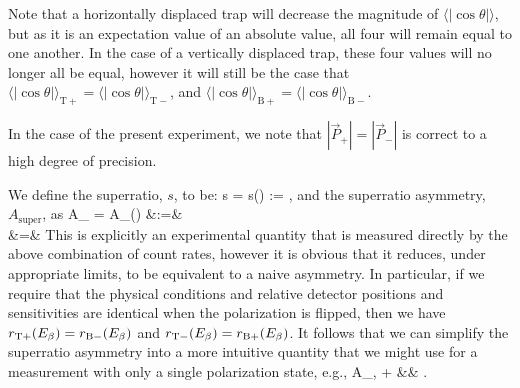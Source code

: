  Note that a horizontally displaced trap will decrease the magnitude of $\langle | \cos\theta | \rangle $, but as it is an expectation value of an absolute value, all four will remain equal to one another.  In the case of a vertically displaced trap, these four values will no longer all be equal, however it will still be the case that $\langle | \cos\theta | \rangle_{\mathrm T +} = \langle | \cos\theta | \rangle_{\mathrm T -}$, and $\langle | \cos\theta | \rangle_{\mathrm B+} = \langle | \cos\theta | \rangle_{\mathrm B -}$.  

In the case of the present experiment, we note that $|\vec{P}_+| = |\vec{P}_-|$ is correct to a high degree of precision.

We define the superratio, $s$, to be:
\bea
s \;\;=\;\; s(\Ebeta) \;\;:=\;\; , 
\eea
and the superratio asymmetry, $A_{\mathrm{super}}$, as
\bea
A_{} \;\;=\;\; A_{}(\Ebeta) &:=&  
\\
&=& 
\eea
%
This is explicitly an experimental quantity that is measured directly by the above combination of count rates, however it is obvious that it reduces, under appropriate limits, to be equivalent to a naive asymmetry.  In particular, if we require that the physical conditions and relative detector positions and sensitivities are identical when the polarization is flipped, then we have $r_{\mathrm T+}(E_{\beta}) = r_{\mathrm B-}(E_{\beta})$ and $r_{\mathrm T-}(E_{\beta}) = r_{\mathrm B+}(E_{\beta})$.
It follows that we can simplify the superratio asymmetry into a more intuitive quantity that we might use for a measurement with only a single polarization state, e.g.,  
\bea
A_{, +} &\rightarrow& . 
\label{eq:singlepol_asymmetry}
\eea

